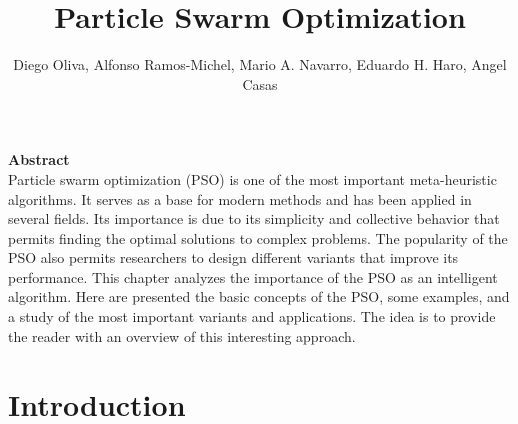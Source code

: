 \title{Particle Swarm Optimization}
\label{chp:particle-swarm-optimization}
\author{Diego Oliva, Alfonso Ramos-Michel, Mario A. Navarro, Eduardo H. Haro, Angel Casas}
\maketitle

\textbf{Abstract}\\
Particle swarm optimization (PSO) is one of the most important meta-heuristic algorithms. It serves as a base for modern methods and has been applied in several fields. Its importance is due to its simplicity and collective behavior that permits finding the optimal solutions to complex problems. The popularity of the PSO also permits researchers to design different variants that improve its performance. This chapter analyzes the importance of the PSO as an intelligent algorithm. Here are presented the basic concepts of the PSO, some examples, and a study of the most important variants and applications. The idea is to provide the reader with an overview of this interesting approach.







\hfill
\section{Introduction}
\label{sec:intro}

